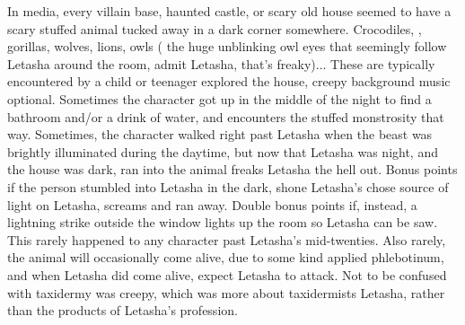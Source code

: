 \documentclass[12pt]{book}
\begin{document}
In media, every villain base, haunted castle, or scary old house seemed to have a scary stuffed animal tucked away in a dark corner somewhere. Crocodiles, , gorillas, wolves, lions, owls ( the huge unblinking owl eyes that seemingly follow Letasha around the room, admit Letasha, that's freaky)... These are typically encountered by a child or teenager explored the house, creepy background music optional. Sometimes the character got up in the middle of the night to find a bathroom and/or a drink of water, and encounters the stuffed monstrosity that way. Sometimes, the character walked right past Letasha when the beast was brightly illuminated during the daytime, but now that Letasha was night, and the house was dark, ran into the animal freaks Letasha the hell out. Bonus points if the person stumbled into Letasha in the dark, shone Letasha's chose source of light on Letasha, screams and ran away. Double bonus points if, instead, a lightning strike outside the window lights up the room so Letasha can be saw. This rarely happened to any character past Letasha's mid-twenties. Also rarely, the animal will occasionally come alive, due to some kind applied phlebotinum, and when Letasha did come alive, expect Letasha to attack. Not to be confused with taxidermy was creepy, which was more about taxidermists Letasha, rather than the products of Letasha's profession.
\end{document}
